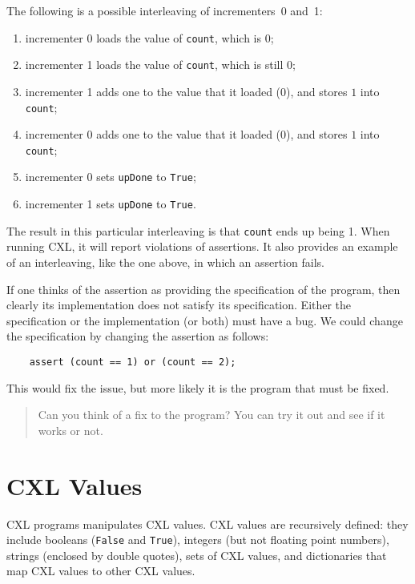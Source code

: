 \documentclass{report}
\newenvironment{code}{
\tcolorbox
}{
\endtcolorbox
}
\begin{document}
The following is a possible interleaving of incrementers~0 and~1:
\begin{enumerate}
\item incrementer 0 loads the value of \texttt{count}, which is 0;
\item incrementer 1 loads the value of \texttt{count}, which is still 0;
\item incrementer 1 adds one to the value that it loaded (0), and
stores $1$ into \texttt{count};
\item incrementer 0 adds one to the value that it loaded (0), and
stores $1$ into \texttt{count};
\item incrementer 0 sets \texttt{upDone} to \texttt{True};
\item incrementer 1 sets \texttt{upDone} to \texttt{True}.
\end{enumerate}

The result in this particular interleaving is that \texttt{count} ends up
being 1.  When running CXL, it will
report violations of assertions.  It also provides an example
of an interleaving, like the one above, in which an assertion fails.

If one thinks of the assertion as providing the specification of the
program, then clearly its implementation does not satisfy its specification.
Either the specification or the implementation (or both) must have a bug.
We could change the specification by changing the assertion as follows:

\begin{code}
\begin{verbatim}
    assert (count == 1) or (count == 2);
\end{verbatim}
\end{code}

This would fix the issue, but more likely it is the program that must
be fixed.

\begin{quote}
Can you think of a fix to the program?  You can try it out and see
if it works or not.
\end{quote}

\chapter{CXL Values}
\label{ch:cxlvalues}

CXL programs manipulates CXL values.
CXL values are recursively defined:
they include booleans (\texttt{False} and \texttt{True}),
integers (but not floating point numbers),
strings (enclosed by double quotes),
sets of CXL values,
and dictionaries that map CXL values to other CXL values.
\end{document}

